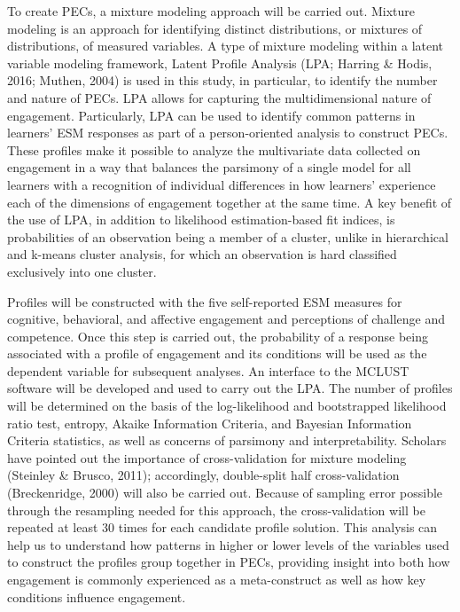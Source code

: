 \documentclass[]{book}
\theoremstyle{definition}
\theoremstyle{definition}
\theoremstyle{definition}
\theoremstyle{remark}
\begin{document}
To create PECs, a mixture modeling approach will be carried out. Mixture
modeling is an approach for identifying distinct distributions, or
mixtures of distributions, of measured variables. A type of mixture
modeling within a latent variable modeling framework, Latent Profile
Analysis (LPA; Harring \& Hodis, 2016; Muthen, 2004) is used in this
study, in particular, to identify the number and nature of PECs. LPA
allows for capturing the multidimensional nature of engagement.
Particularly, LPA can be used to identify common patterns in learners'
ESM responses as part of a person-oriented analysis to construct PECs.
These profiles make it possible to analyze the multivariate data
collected on engagement in a way that balances the parsimony of a single
model for all learners with a recognition of individual differences in
how learners' experience each of the dimensions of engagement together
at the same time. A key benefit of the use of LPA, in addition to
likelihood estimation-based fit indices, is probabilities of an
observation being a member of a cluster, unlike in hierarchical and
k-means cluster analysis, for which an observation is hard classified
exclusively into one cluster.

Profiles will be constructed with the five self-reported ESM measures
for cognitive, behavioral, and affective engagement and perceptions of
challenge and competence. Once this step is carried out, the probability
of a response being associated with a profile of engagement and its
conditions will be used as the dependent variable for subsequent
analyses. An interface to the MCLUST software will be developed and used
to carry out the LPA. The number of profiles will be determined on the
basis of the log-likelihood and bootstrapped likelihood ratio test,
entropy, Akaike Information Criteria, and Bayesian Information Criteria
statistics, as well as concerns of parsimony and interpretability.
Scholars have pointed out the importance of cross-validation for mixture
modeling (Steinley \& Brusco, 2011); accordingly, double-split half
cross-validation (Breckenridge, 2000) will also be carried out. Because
of sampling error possible through the resampling needed for this
approach, the cross-validation will be repeated at least 30 times for
each candidate profile solution. This analysis can help us to understand
how patterns in higher or lower levels of the variables used to
construct the profiles group together in PECs, providing insight into
both how engagement is commonly experienced as a meta-construct as well
as how key conditions influence engagement.
\end{document}
